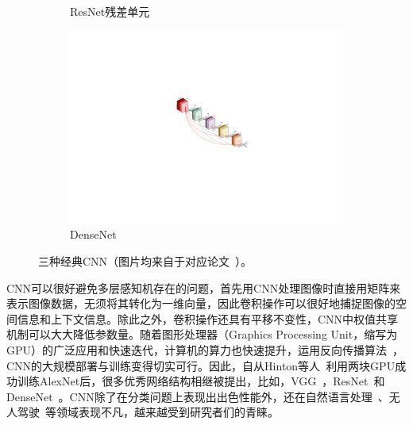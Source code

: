\begin{figure}[h!]
\begin{subfigure}{0.336\textwidth}
		\caption{ResNet残差单元~\cite{he2016deep}}
		\label{subfig:resnet_block}
	\end{subfigure}
	\begin{subfigure}{0.265\textwidth}
		\centering
		\includegraphics[width=1.0\textwidth]{figure/popular_networks_densenet}
		\caption{DenseNet~\cite{huang2017densely}}
	\end{subfigure}
	\caption[三种经典CNN]{三种经典CNN（图片均来自于对应论文~\cite{krizhevsky2012imagenet, he2016deep, huang2017densely}）。} 
	\label{mulfig:popular_networks}
\end{figure}


CNN可以很好避免多层感知机存在的问题，首先用CNN处理图像时直接用矩阵来表示图像数据，无须将其转化为一维向量，因此卷积操作可以很好地捕捉图像的空间信息和上下文信息。除此之外，卷积操作还具有平移不变性，CNN中权值共享机制可以大大降低参数量。随着图形处理器（Graphics Processing Unit，缩写为GPU）的广泛应用和快速迭代，计算机的算力也快速提升，运用反向传播算法~\cite{hecht1992theory}，CNN的大规模部署与训练变得切实可行。因此，自从Hinton等人~\cite{krizhevsky2012imagenet}利用两块GPU成功训练AlexNet后，很多优秀网络结构相继被提出，比如，VGG~\cite{simonyan2014very}，ResNet~\cite{he2016deep, he2016identity}和DenseNet~\cite{huang2017densely}。CNN除了在分类问题上表现出出色性能外，还在自然语言处理~\cite{dos2014deep, mou2016Convolutional}、无人驾驶~\cite{lee2017deep}等领域表现不凡，越来越受到研究者们的青睐。

